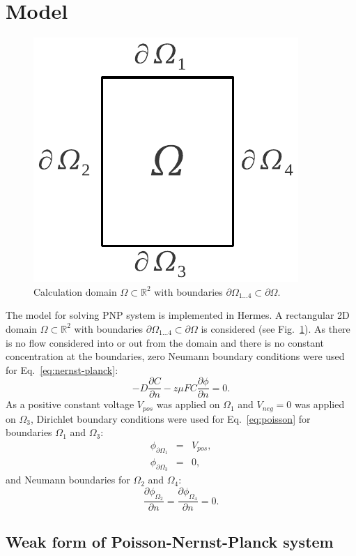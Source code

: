 \section{Model}
\label{sec:model}

\begin{figure}
  \begin{centering}
  \includegraphics[width=0.2\columnwidth]{domain}
  \caption{\label{fig:domain} Calculation domain $\Omega\subset\mathbb{R}^2$
  	with boundaries $\partial\Omega_{1\ldots 4}\subset\partial\Omega$.}
  \end{centering}
\end{figure}

The model for solving PNP system is implemented in Hermes.
A rectangular 2D domain $\Omega\subset\mathbb{R}^2$ with boundaries 
$\partial\Omega_{1\ldots 4}\subset\partial\Omega$  is considered (see Fig.~\ref{fig:domain}). 
As there is no flow considered into or out from the domain and there is no
constant concentration at the boundaries, zero Neumann boundary conditions were used 
for Eq.~\eqref{eq:nernst-planck}:
\begin{equation}
  -D \frac{\partial C}{\partial n} - z \mu F C \frac{\partial \phi} {\partial n} = 0.
  \label{eq:nernst-planck-boundary}
\end{equation}
As a positive constant voltage $V_{pos}$ was applied on $\Omega_1$ and $V_{neg}=0$ was applied
on $\Omega_3$, Dirichlet boundary conditions were used for Eq.~\eqref{eq:poisson} for
boundaries $\Omega_1$ and $\Omega_3$:
\begin{eqnarray}
  \phi_{\partial\Omega_1}&=&V_{pos},\\
  \phi_{\partial\Omega_3}&=&0,
  \label{eq:dirichlet}
\end{eqnarray}
and Neumann boundaries for $\Omega_2$ and $\Omega_4$:
\begin{equation}
  \frac{\partial \phi_{\Omega_2}}{\partial n}=\frac{\partial \phi_{\Omega_4}}{\partial n}=0.
\end{equation}


\subsection{Weak form of Poisson-Nernst-Planck system}

